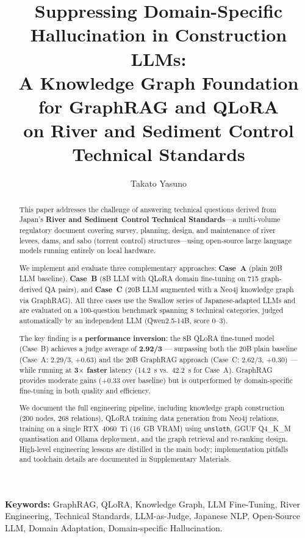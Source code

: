 \documentclass[twocolumn]{article}
\title{Suppressing Domain-Specific Hallucination in Construction LLMs:\\
A Knowledge Graph Foundation for GraphRAG and QLoRA\\
on River and Sediment Control Technical Standards}
\author[1]{Takato Yasuno}
\date{}
\begin{document}
\maketitle

\begin{abstract}

This paper addresses the challenge of answering technical questions derived from Japan's
\textbf{River and Sediment Control Technical Standards}---a multi-volume regulatory document
covering survey, planning, design, and maintenance of river levees, dams, and sabo (torrent
control) structures---using open-source large language models running entirely on local hardware.

We implement and evaluate three complementary approaches:
\textbf{Case~A} (plain 20B LLM baseline),
\textbf{Case~B} (8B LLM with QLoRA domain fine-tuning on 715 graph-derived QA pairs), and
\textbf{Case~C} (20B LLM augmented with a Neo4j knowledge graph via GraphRAG).
All three cases use the Swallow series of Japanese-adapted LLMs and are evaluated on a
100-question benchmark spanning 8 technical categories, judged automatically by an
independent LLM (Qwen2.5-14B, score 0--3).

The key finding is a \textbf{performance inversion}: the 8B QLoRA fine-tuned model (Case~B)
achieves a judge average of \textbf{2.92/3} --- surpassing both the 20B plain baseline
(Case~A: 2.29/3, $+$0.63) and the 20B GraphRAG approach (Case~C: 2.62/3, $+$0.30) ---
while running at \textbf{3$\times$ faster} latency (14.2~s vs.\ 42.2~s for Case~A).
GraphRAG provides moderate gains ($+$0.33 over baseline) but is outperformed by
domain-specific fine-tuning in both quality and efficiency.

We document the full engineering pipeline, including knowledge graph construction
(200 nodes, 268 relations), QLoRA training data generation from Neo4j relations,
training on a single RTX~4060~Ti (16~GB VRAM) using \texttt{unsloth}, GGUF Q4\_K\_M quantisation
and Ollama deployment, and the graph retrieval and re-ranking design.
High-level engineering lessons are distilled in the main body;
implementation pitfalls and toolchain details are documented in Supplementary Materials.

\end{abstract}

\noindent
\textbf{Keywords:} GraphRAG, QLoRA, Knowledge Graph, LLM Fine-Tuning,
River Engineering, Technical Standards, LLM-as-Judge, Japanese NLP,
Open-Source LLM, Domain Adaptation, Domain-specific Hallucination.
\end{document}
